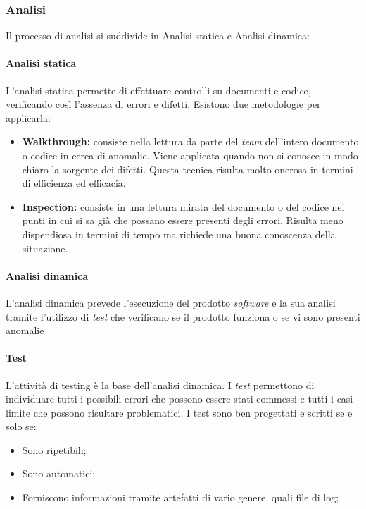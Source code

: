 				\subsubsection{Analisi}
					Il processo di analisi si suddivide in Analisi statica e Analisi dinamica:
						\paragraph*{Analisi statica}
						\aCapo{}  
							L'analisi statica permette di effettuare controlli su documenti e codice, verificando così l'assenza di errori e difetti. Esistono due metodologie per applicarla:
								\begin{itemize}
									\item \textbf{Walkthrough:} consiste nella lettura da parte del \emph{team} dell'intero documento o codice in cerca di anomalie. Viene applicata quando non si conosce in modo chiaro la sorgente dei difetti. Questa tecnica risulta molto onerosa in termini di efficienza ed efficacia.
									\item \textbf{Inspection:} consiste in una lettura mirata del documento o del codice nei punti in cui si sa già che possano essere presenti degli errori. Risulta meno dispendiosa in termini di tempo ma richiede una buona conoscenza della situazione.
								\end{itemize}
						\paragraph*{Analisi dinamica}
						\aCapo{}  
							L'analisi dinamica prevede l'esecuzione del prodotto \emph{software} e la sua analisi tramite l'utilizzo di \emph{test} che verificano se il prodotto funziona o se vi sono presenti anomalie
						\paragraph*{Test}
						\aCapo{}  
							L'attività di testing è la base dell'analisi dinamica. I \emph{test} permettono di individuare tutti i possibili errori che possono essere stati commessi e tutti i casi limite che possono risultare problematici. \newline
							I test sono ben progettati e scritti se e solo se:
								\begin{itemize}
									\item Sono ripetibili;
									\item Sono automatici;
									\item Forniscono informazioni tramite artefatti di vario genere, quali file di log;
								\end{itemize}
		
